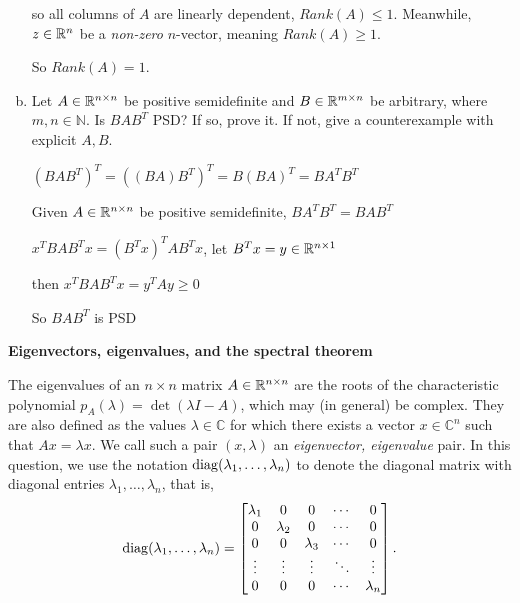 \begin{enumerate}[(a)]
    so all columns of $A$ are linearly dependent, $Rank(A) \le 1$. Meanwhile, $z \in \mathbb{R}^n$ be a \emph{non-zero} $n$-vector, meaning $Rank(A) \ge 1$.

    So $Rank(A) = 1$.

  \item Let $A \in \mathbb{R}^{n \times n}$ be positive semidefinite and
    $B \in \mathbb{R}^{m \times n}$ be arbitrary, where $m, n \in \mathbb{N}$. Is
    $BAB^T$ PSD?  If so, prove it.  If not, give a counterexample with
    explicit $A, B$.

    $(B A B ^T) ^ T = ((BA)B^T)^T = B(BA)^T = B A^T B^T$

    Given $A \in \mathbb{R}^{n \times n}$ be positive semidefinite, $B A^T B^T = B A B^T$

    $x^T B A B ^T x = (B^T x) ^T A B^T x$, let $B^T x = y \in \mathbb{R}^{n \times 1}$ 

    then $x^T B A B ^T x = y^T A y \ge 0$ 

    So $BAB^T$ is PSD

  \end{enumerate}

\newpage

  \item {} \textbf{Eigenvectors, eigenvalues, and the spectral
    theorem}

  The eigenvalues of an $n \times n$ matrix $A \in \mathbb{R}^{n \times n}$ are the
  roots of the characteristic polynomial $p_A(\lambda) = \det(\lambda I - A)$,
  which may (in general) be complex.  They are also defined as the values
  $\lambda \in \mathbb{C}$ for which there exists a vector
  $x \in \mathbb{C}^n$ such that $Ax = \lambda x$. We call such a pair
  $(x, \lambda)$ an \emph{eigenvector, eigenvalue} pair.
  In this question, we use the notation
  $\mathop{\rm diag}(\lambda_1, \ldots, \lambda_n)$ to denote the diagonal matrix with
  diagonal entries $\lambda_1, \ldots, \lambda_n$, that is,
    \begin{equation*}
      \mathop{\rm diag}(\lambda_1, \ldots, \lambda_n)
      = \left[\begin{matrix} \lambda_1 & 0 & 0 & \cdots & 0 \\
          0 & \lambda_2 & 0 & \cdots & 0 \\
          0 & 0 & \lambda_3 & \cdots & 0 \\
          \vdots & \vdots & \vdots & \ddots  & \vdots \\
          0 & 0 & 0 & \cdots & \lambda_n \end{matrix} \right].
    \end{equation*}
    
